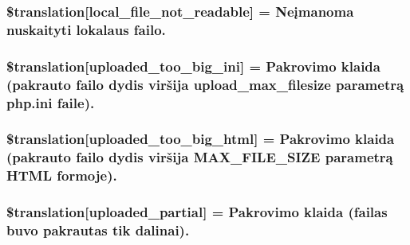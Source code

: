 \subsubsection[{\$translation}]{\setlength{\rightskip}{0pt plus 5cm}\$translation\mbox{[}\textquotesingle{}local\+\_\+file\+\_\+not\+\_\+readable\textquotesingle{}\mbox{]} = \textquotesingle{}Neįmanoma nuskaityti lokalaus failo.\textquotesingle{}}\label{class_8upload_8lt___l_t_8php_a60104befef9b241f3a7a6a755618a4b3}
\hypertarget{class_8upload_8lt___l_t_8php_a6a08dcd0d3651fdd098568f6b2f0a42c}{}
\subsubsection[{\$translation}]{\setlength{\rightskip}{0pt plus 5cm}\$translation\mbox{[}\textquotesingle{}uploaded\+\_\+too\+\_\+big\+\_\+ini\textquotesingle{}\mbox{]} = \textquotesingle{}Pakrovimo klaida (pakrauto failo dydis viršija upload\+\_\+max\+\_\+filesize parametrą php.\+ini faile).\textquotesingle{}}\label{class_8upload_8lt___l_t_8php_a6a08dcd0d3651fdd098568f6b2f0a42c}
\hypertarget{class_8upload_8lt___l_t_8php_a623d5b8b92169f57d7e43458aa911cbb}{}
\subsubsection[{\$translation}]{\setlength{\rightskip}{0pt plus 5cm}\$translation\mbox{[}\textquotesingle{}uploaded\+\_\+too\+\_\+big\+\_\+html\textquotesingle{}\mbox{]} = \textquotesingle{}Pakrovimo klaida (pakrauto failo dydis viršija M\+A\+X\+\_\+\+F\+I\+L\+E\+\_\+\+S\+I\+Z\+E parametrą H\+T\+M\+L formoje).\textquotesingle{}}\label{class_8upload_8lt___l_t_8php_a623d5b8b92169f57d7e43458aa911cbb}
\hypertarget{class_8upload_8lt___l_t_8php_a967c17da21b0a2d3bd65cca3a9ca0ea8}{}
\subsubsection[{\$translation}]{\setlength{\rightskip}{0pt plus 5cm}\$translation\mbox{[}\textquotesingle{}uploaded\+\_\+partial\textquotesingle{}\mbox{]} = \textquotesingle{}Pakrovimo klaida (failas buvo pakrautas tik dalinai).\textquotesingle{}}\label{class_8upload_8lt___l_t_8php_a967c17da21b0a2d3bd65cca3a9ca0ea8}
\hypertarget{class_8upload_8lt___l_t_8php_a0cce433260be65f1f35853a6b4b8952b}{}
